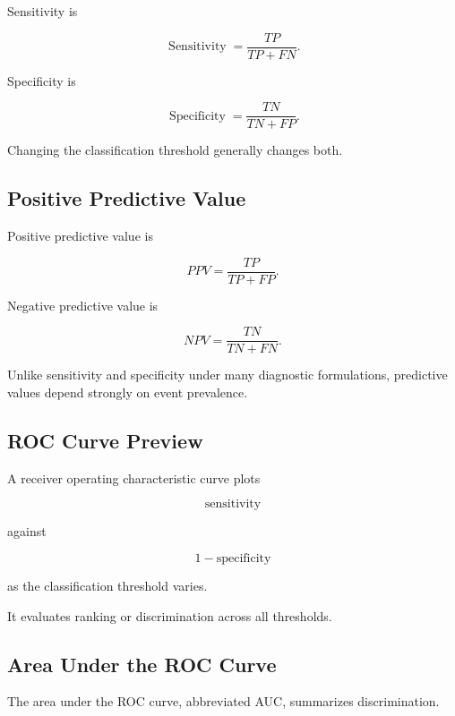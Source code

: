 Sensitivity is

\[
\boxed{
\operatorname{Sensitivity}
=
\frac{
TP
}{
TP+FN
}.
}
\]

Specificity is

\[
\boxed{
\operatorname{Specificity}
=
\frac{
TN
}{
TN+FP
}.
}
\]

Changing the classification threshold generally changes both.

\subsection{Positive Predictive Value}
\label{subsec:positive-predictive-value}

Positive predictive value is

\[
\boxed{
PPV
=
\frac{
TP
}{
TP+FP
}.
}
\]

Negative predictive value is

\[
\boxed{
NPV
=
\frac{
TN
}{
TN+FN
}.
}
\]

Unlike sensitivity and specificity under many diagnostic formulations,
predictive values depend strongly on event prevalence.

\subsection{ROC Curve Preview}
\label{subsec:roc-curve-preview}

A receiver operating characteristic curve plots

\[
\boxed{
\text{sensitivity}
}
\]

against

\[
\boxed{
1-\text{specificity}
}
\]

as the classification threshold varies.

It evaluates ranking or discrimination across all thresholds.

\subsection{Area Under the ROC Curve}
\label{subsec:auc-preview}

The area under the ROC curve, abbreviated AUC, summarizes discrimination.


